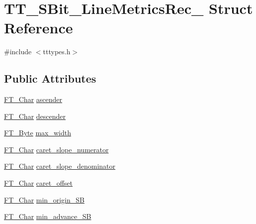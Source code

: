 \hypertarget{struct_t_t___s_bit___line_metrics_rec__}{\section{T\-T\-\_\-\-S\-Bit\-\_\-\-Line\-Metrics\-Rec\-\_\- Struct Reference}
\label{struct_t_t___s_bit___line_metrics_rec__}
}


{\ttfamily \#include $<$tttypes.\-h$>$}

\subsection*{Public Attributes}
\begin{DoxyCompactItemize}
\item 
\hyperlink{fttypes_8h_a0f851552b050883885f0a0855771f39d}{F\-T\-\_\-\-Char} \hyperlink{struct_t_t___s_bit___line_metrics_rec___a4114f4a3c2955d708af80a4fedac026c}{ascender}
\item 
\hyperlink{fttypes_8h_a0f851552b050883885f0a0855771f39d}{F\-T\-\_\-\-Char} \hyperlink{struct_t_t___s_bit___line_metrics_rec___a3c387250cdf45758febc01ed1b4ef00b}{descender}
\item 
\hyperlink{fttypes_8h_a51f26183ca0c9f4af958939648caeccd}{F\-T\-\_\-\-Byte} \hyperlink{struct_t_t___s_bit___line_metrics_rec___aebad76a445c06ac0634a60a015b0f626}{max\-\_\-width}
\item 
\hyperlink{fttypes_8h_a0f851552b050883885f0a0855771f39d}{F\-T\-\_\-\-Char} \hyperlink{struct_t_t___s_bit___line_metrics_rec___a881a12022b8d2c6524caaf17a1533371}{caret\-\_\-slope\-\_\-numerator}
\item 
\hyperlink{fttypes_8h_a0f851552b050883885f0a0855771f39d}{F\-T\-\_\-\-Char} \hyperlink{struct_t_t___s_bit___line_metrics_rec___a07a53a9cc279b5d98e54d1fc6fe6e480}{caret\-\_\-slope\-\_\-denominator}
\item 
\hyperlink{fttypes_8h_a0f851552b050883885f0a0855771f39d}{F\-T\-\_\-\-Char} \hyperlink{struct_t_t___s_bit___line_metrics_rec___a313481bae7dbe952123b0e41d1d0bd10}{caret\-\_\-offset}
\item 
\hyperlink{fttypes_8h_a0f851552b050883885f0a0855771f39d}{F\-T\-\_\-\-Char} \hyperlink{struct_t_t___s_bit___line_metrics_rec___a9e87d66e6546346385864d416dfbb9a9}{min\-\_\-origin\-\_\-\-S\-B}
\item 
\hyperlink{fttypes_8h_a0f851552b050883885f0a0855771f39d}{F\-T\-\_\-\-Char} \hyperlink{struct_t_t___s_bit___line_metrics_rec___ad4f4578a99ce4537bd454bf47a60074c}{min\-\_\-advance\-\_\-\-S\-B}

\end{DoxyCompactItemize}
